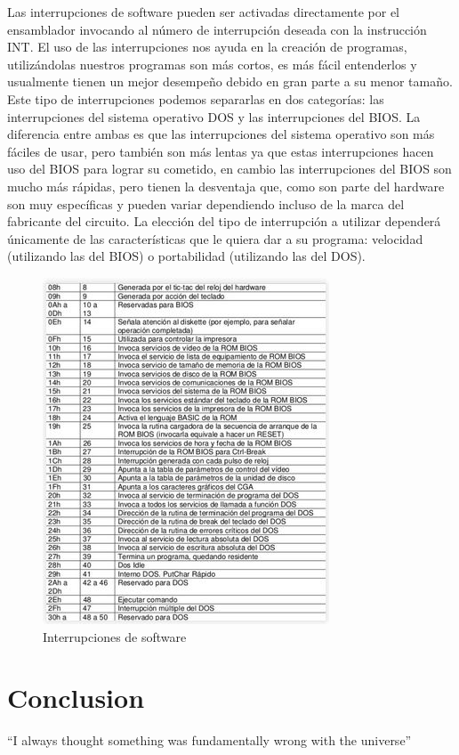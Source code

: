 \documentclass{article}
\begin{document}
Las interrupciones de software pueden ser activadas directamente por el ensamblador invocando al número de interrupción deseada con la instrucción INT.
El uso de las interrupciones nos ayuda en la creación de programas, utilizándolas nuestros programas son más cortos, es más fácil entenderlos y usualmente tienen un mejor desempeño debido en gran parte a su menor tamaño.
Este tipo de interrupciones podemos separarlas en dos categorías: las interrupciones del sistema operativo DOS y las interrupciones del BIOS.
La diferencia entre ambas es que las interrupciones del sistema operativo son más fáciles de usar, pero también son más lentas ya que estas interrupciones hacen uso del BIOS para lograr su cometido, en cambio las interrupciones del BIOS son mucho más rápidas, pero tienen la desventaja que, como son parte del hardware son muy específicas y pueden variar dependiendo incluso de la marca del fabricante del circuito.
La elección del tipo de interrupción a utilizar dependerá únicamente de las características que le quiera dar a su programa: velocidad (utilizando las del BIOS) o portabilidad (utilizando las del DOS).

\begin{figure}[h]
\centering
\includegraphics[scale=1.2]{interrupciones2}
\caption{Interrupciones de software}
\label{fig:interrupciones2}
\end{figure}


\section{Conclusion}
``I always thought something was fundamentally wrong with the universe'' \citep{adams1995hitchhiker}



\end{document}
